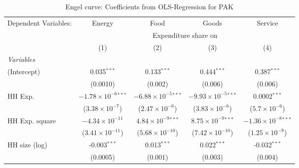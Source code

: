 
\begin{table}[htbp!]
   \centering
   \small
   \begin{adjustbox}{width = 1\textwidth, max height = 0.95\textheight, center}
      \begin{threeparttable}[b]
         \caption{\label{tab:Engel_parametric_PAK} Engel curve: Coefficients from OLS-Regression for PAK}
         \begin{tabular}{lcccc}
            \tabularnewline \midrule \midrule
            Dependent Variables: & Energy                         & Food                           & Goods                          & Service\\  
             & \multicolumn{4}{c}{Expenditure share on} \\ 
                                 & (1)                            & (2)                            & (3)                            & (4)\\  
            \midrule
            \emph{Variables}\\
            (Intercept)          & 0.035$^{***}$                  & 0.133$^{***}$                  & 0.444$^{***}$                  & 0.387$^{***}$\\   
                                 & (0.0010)                       & (0.002)                        & (0.006)                        & (0.006)\\   
            HH Exp.              & $-1.78\times 10^{-6}$$^{***}$  & $-6.88\times 10^{-5}$$^{***}$  & $-9.93\times 10^{-5}$$^{***}$  & 0.0002$^{***}$\\   
                                 & ($3.38\times 10^{-7}$)         & ($2.47\times 10^{-6}$)         & ($3.83\times 10^{-6}$)         & ($5.7\times 10^{-6}$)\\    
            HH Exp. square       & $-4.34\times 10^{-11}$         & $4.84\times 10^{-9}$$^{***}$   & $8.75\times 10^{-9}$$^{***}$   & $-1.36\times 10^{-8}$$^{***}$\\    
                                 & ($3.41\times 10^{-11}$)        & ($5.68\times 10^{-10}$)        & ($7.42\times 10^{-10}$)        & ($1.25\times 10^{-9}$)\\    
            HH size (log)        & -0.003$^{***}$                 & 0.013$^{***}$                  & 0.022$^{***}$                  & -0.032$^{***}$\\   
                                 & (0.0005)                       & (0.001)                        & (0.003)                        & (0.004)\\   

\end{tabular}
\end{threeparttable}
\end{adjustbox}
\end{table}
